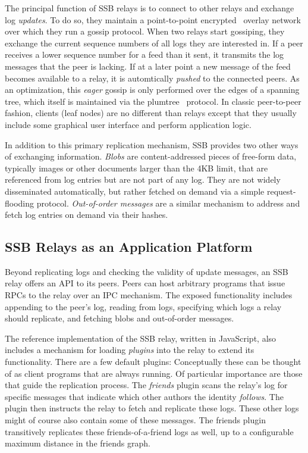 \documentclass[10pt,sigconf]{acmart}
\begin{document}
The principal function of SSB relays is to connect to other relays and exchange log {\em updates}. To do so, they maintain a point-to-point encrypted~\cite{tarr2015secrethandshake} overlay network over which they run a gossip protocol. When two relays start gossiping, they exchange the current sequence numbers of all logs they are interested in. If a peer receives a lower sequence number for a feed than it sent, it transmits the log messages that the peer is lacking. If at a later point a new message of the feed becomes available to a relay, it is automtically \textit{pushed} to the connected peers. As an optimization, this {\em eager} gossip is only performed over the edges of a spanning tree, which itself is maintained via the plumtree~\cite{leitao2007epidemic} protocol. In classic peer-to-peer fashion, clients (leaf nodes) are no different than relays except that they usually include some graphical user interface and perform application logic.

In addition to this primary replication mechanism, SSB provides two other ways of exchanging information. {\em Blobs} are content-addressed pieces of free-form data, typically images or other documents larger than the 4KB limit, that are referenced from log entries but are not part of any log. They are not widely disseminated automatically, but rather fetched on demand via a simple request-flooding protocol. {\em Out-of-order messages} are a similar mechanism to address and fetch log entries on demand via their hashes.

\subsection*{SSB Relays as an Application Platform}

Beyond replicating logs and checking the validity of update messages, an SSB relay offers an API to its peers. Peers can host arbitrary programs that issue RPCs to the relay over an IPC mechanism. The exposed functionality includes appending to the peer's log, reading from logs, specifying which logs a relay should replicate, and fetching blobs and out-of-order messages.

The reference implementation of the SSB relay, written in JavaScript, also includes a mechanism for loading {\em plugins} into the relay to extend its functionality. There are a few default plugins: Conceptually these can be thought of as client programs that are always running. Of particular importance are those that guide the replication process. The {\em friends} plugin scans the relay's log for specific messages that indicate which other authors the identity {\em follows}. The plugin then instructs the relay to fetch and replicate these logs. These other logs might of course also contain some of these messages. The friends plugin transitively replicates these friends-of-a-friend logs as well, up to a configurable maximum distance in the friends graph.
\end{document}
